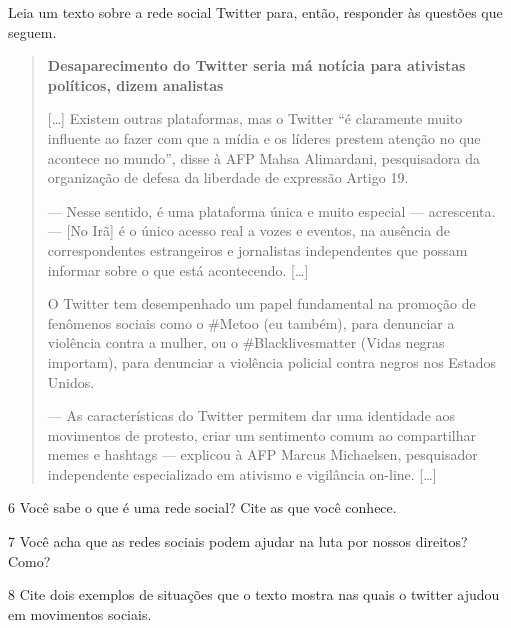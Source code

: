 Leia um texto sobre a rede social Twitter para, então, responder às questões que seguem.

\begin{quote}
\textbf{Desaparecimento do Twitter seria má notícia para ativistas
políticos, dizem analistas }

{[}\ldots{}{]}
Existem outras plataformas, mas o Twitter “é claramente muito influente
ao fazer com que a mídia e os líderes prestem atenção no que acontece no
mundo”, disse à AFP Mahsa Alimardani, pesquisadora da organização de
defesa da liberdade de expressão Artigo 19.

--- Nesse sentido, é uma plataforma única e muito especial ---
acrescenta. --- {[}No Irã{]} é o único acesso real a vozes e eventos, na
ausência de correspondentes estrangeiros e jornalistas independentes que
possam informar sobre o que está acontecendo. {[}\ldots{}{]}

O Twitter tem desempenhado um papel fundamental na promoção de fenômenos
sociais como o \#Metoo (eu também), para denunciar a violência contra a
mulher, ou o \#Blacklivesmatter (Vidas negras importam), para denunciar
a violência policial contra negros nos Estados Unidos.

--- As características do Twitter permitem dar uma identidade aos
movimentos de protesto, criar um sentimento comum ao compartilhar memes
e hashtags --- explicou à AFP Marcus Michaelsen, pesquisador independente especializado em ativismo e vigilância on-line. {[}\ldots{}{]}

\end{quote}

\num{6} Você sabe o que é uma rede social? Cite as que você conhece.


\num{7} Você acha que as redes sociais podem ajudar na luta por nossos direitos? Como?


\num{8} Cite dois exemplos de situações que o texto mostra nas quais o twitter ajudou
em movimentos sociais.

